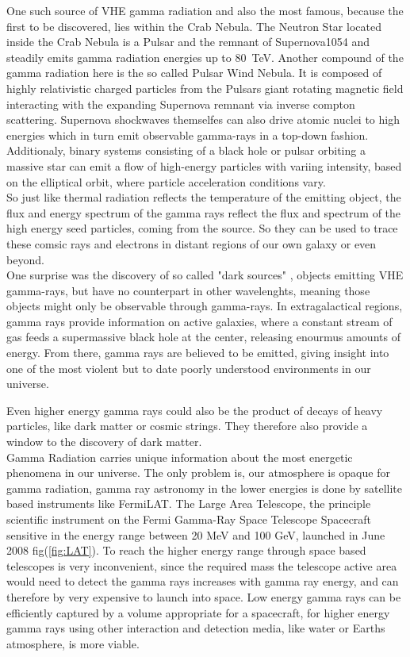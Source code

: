 \documentclass[12pt,article,type=msc,colorback,accentcolor=tud9c]{tudthesis}
\begin{document}
One such source of VHE gamma radiation and also the most famous, because the first to be discovered, lies within the Crab Nebula. The Neutron Star located inside the Crab Nebula is a Pulsar and the remnant of Supernova1054 and steadily emits gamma radiation energies up to 80~TeV. Another compound of the gamma radiation here is the so called Pulsar Wind Nebula. It is composed of highly relativistic charged particles from the Pulsars giant rotating magnetic field interacting with the expanding Supernova remnant via inverse compton scattering. Supernova shockwaves themselfes can also drive atomic nuclei to high energies which in turn emit observable gamma-rays in a top-down fashion. Additionaly, binary systems consisting of a black hole or pulsar orbiting a massive star can emit a flow of high-energy particles with variing intensity, based on the elliptical orbit, where particle acceleration conditions vary.\\
So just like thermal radiation reflects the temperature of the emitting object, the flux and energy spectrum of the gamma rays reflect the flux and spectrum of the high energy seed particles, coming from the source. So they can be used to trace these comsic rays and electrons in distant regions of our own galaxy or even beyond. \cite{TeVAstro} \\
One surprise was the discovery of so called "dark sources" , objects emitting VHE gamma-rays, but have no counterpart in other wavelenghts, meaning those objects might only be observable through gamma-rays. In extragalactical regions, gamma rays provide information on active galaxies, where a constant stream of gas feeds a supermassive black hole at the center, releasing enourmus amounts of energy. From there, gamma rays are believed to be emitted, giving insight into one of the most violent but to date poorly understood environments in our universe. 

Even higher energy gamma rays could also be the product of decays of heavy particles, like dark matter or cosmic strings. They therefore also provide a window to the discovery of dark matter.\\

Gamma Radiation carries unique information about the most energetic phenomena in our universe. 
The only problem is, our atmosphere is opaque for gamma radiation, gamma ray astronomy in the lower energies is done by satellite based instruments like FermiLAT. The Large Area Telescope, the principle scientific instrument on the Fermi Gamma-Ray Space Telescope Spacecraft sensitive in the energy range between 20 MeV and 100 GeV, launched in June 2008 fig(\ref{fig:LAT}). To reach the higher energy range through space based telescopes is very inconvenient, since the required mass the telescope active area would need to detect the gamma rays increases with gamma ray energy, and can therefore by very expensive to launch into space. Low energy gamma rays can be efficiently captured by a volume appropriate for a spacecraft, for higher energy gamma rays using other interaction and detection media, like water or Earths atmosphere, is more viable.
\end{document}
